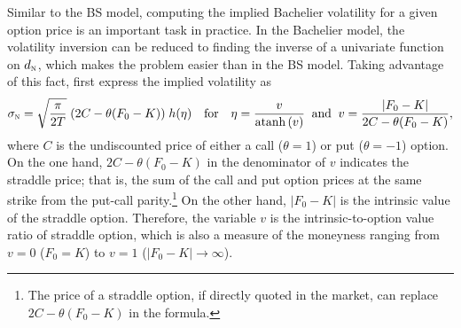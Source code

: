 \documentclass[a4paper,review]{elsarticle}
\newcommand{\qtext}[2][\quad]{#1\text{#2}#1}
\newcommand{\sigman}{\sigma_\textsc{n}}
\newcommand{\norm}{\textsc{n}}
\newcommand{\atanh}{\mathrm{atanh}}
\begin{document}
Similar to the BS model, computing the implied Bachelier volatility for a given option price is an important task in practice. In the Bachelier model, the volatility inversion can be reduced to finding the inverse of a univariate function on $d_\norm$, which makes the problem easier than in the BS model. Taking advantage of this fact, \citet{choi2009impvol} first express the implied volatility as
\begin{equation} \label{eq:iv}
	\sigman = \sqrt\frac{\pi}{2T}\;(2 C - \theta(F_0-K))\;h(\eta) \qtext{for}
	\eta = \frac{v}{\atanh\left(v\right)} \;\;\text{and}\;\; v = \frac{|F_0 - K|}{2C - \theta(F_0-K)},
\end{equation}
where $C$ is the undiscounted price of either a call ($\theta=1$) or put ($\theta=-1$) option. On the one hand, $2C - \theta(F_0-K)$ in the denominator of $v$ indicates the straddle price; that is, the sum of the call and put option prices at the same strike from the put-call parity.\footnote{The price of a straddle option, if directly quoted in the market, can replace $2C - \theta(F_0-K)$ in the formula.} On the other hand, $|F_0-K|$ is the intrinsic value of the straddle option. Therefore, the variable $v$ is the intrinsic-to-option value ratio of straddle option, which is also a measure of the moneyness ranging from $v=0$ ($F_0=K$) to $v=1$ ($|F_0-K| \rightarrow \infty$).
\end{document}
